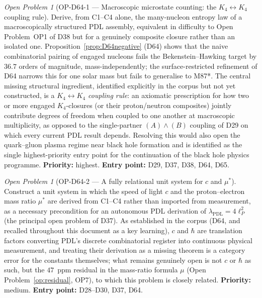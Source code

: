 \documentclass[11pt,a4paper]{article}
\theoremstyle{plain}
\theoremstyle{definition}
\theoremstyle{remark}
\newtheorem{openproblem}[theorem]{Open Problem}
\newcommand{\Kfour}{K_4}
\begin{document}
\begin{openproblem}[OP-D64-1 --- Macroscopic microstate counting: the $K_4\leftrightarrow K_4$ coupling rule]
\label{op:D64one}
Derive, from C1--C4 alone, the many-nucleon entropy law of a macroscopically structured PDL assembly, equivalent in difficulty to Open Problem~OP1 of D38 but for a genuinely composite closure rather than an isolated one. Proposition~\ref{prop:D64negative} (D64) shows that the naive combinatorial pairing of engaged nucleons fails the Bekenstein--Hawking target by $36.7$ orders of magnitude, mass-independently; the surface-restricted refinement of D64 narrows this for one solar mass but fails to generalise to M87*. The central missing structural ingredient, identified explicitly in the corpus but not yet constructed, is a \emph{$K_4\leftrightarrow K_4$ coupling rule}: an axiomatic prescription for how two or more engaged $\Kfour$-closures (or their proton/neutron composites) jointly contribute degrees of freedom when coupled to one another at macroscopic multiplicity, as opposed to the single-partner $(A)\wedge(B)$ coupling of D29 on which every current PDL result depends. Resolving this would also open the quark--gluon plasma regime near black hole formation and is identified as the single highest-priority entry point for the continuation of the black hole physics programme. \textbf{Priority:} highest. \textbf{Entry point:} D29, D37, D38, D64, D65.
\end{openproblem}

\begin{openproblem}[OP-D64-2 --- A fully relational unit system for $c$ and $\mu^*$]
\label{op:D64two}
Construct a unit system in which the speed of light $c$ and the proton--electron mass ratio $\mu^*$ are derived from C1--C4 rather than imported from measurement, as a necessary precondition for an autonomous PDL derivation of $\lambda_{\mathrm{PDL}}=4\ell_P^2$ (the principal open problem of D37). As established in the corpus (D64, and recalled throughout this document as a key learning), $c$ and $\hbar$ are translation factors converting PDL's discrete combinatorial register into continuous physical measurement, and treating their derivation as a missing theorem is a category error for the constants themselves; what remains genuinely open is not $c$ or $\hbar$ as such, but the $47$~ppm residual in the mass-ratio formula $\mu$ (Open Problem~\ref{op:residual}, OP7), to which this problem is closely related. \textbf{Priority:} medium. \textbf{Entry point:} D28--D30, D37, D64.
\end{openproblem}
\end{document}
